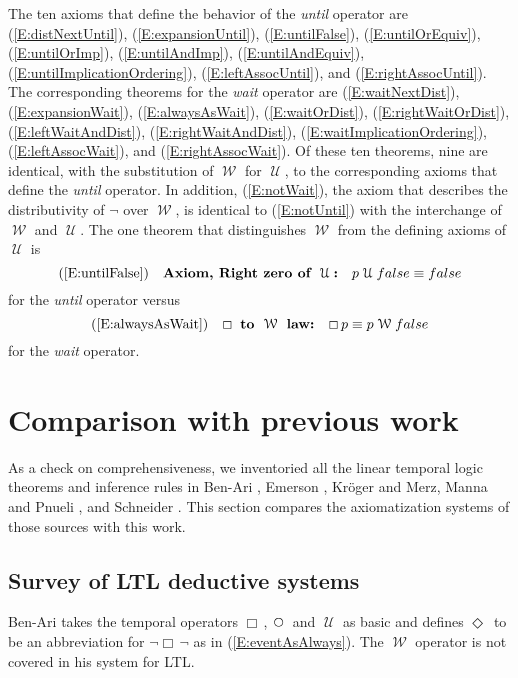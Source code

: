 \documentclass[12pt, fleqn, leqno]{article}
\newcommand{\Until}{\;\mathcal{U}\;}
\newcommand{\Wait}{\;\mathcal{W}\;}
\newcommand{\Next}{\;\,\text{\raisebox{3.5pt}{\circle{6}}}}
\newcommand{\Event}{\Diamond\,}
\newcommand{\Always}{\Box\,}
\begin{document}
The ten axioms that define the behavior of the \textit{until} operator are (\ref{E:distNextUntil}), (\ref{E:expansionUntil}), (\ref{E:untilFalse}), (\ref{E:untilOrEquiv}), (\ref{E:untilOrImp}), (\ref{E:untilAndImp}), (\ref{E:untilAndEquiv}), (\ref{E:untilImplicationOrdering}), (\ref{E:leftAssocUntil}), and (\ref{E:rightAssocUntil}).
The corresponding theorems for the \textit{wait} operator are (\ref{E:waitNextDist}), (\ref{E:expansionWait}), (\ref{E:alwaysAsWait}), (\ref{E:waitOrDist}), (\ref{E:rightWaitOrDist}), (\ref{E:leftWaitAndDist}), (\ref{E:rightWaitAndDist}), (\ref{E:waitImplicationOrdering}), (\ref{E:leftAssocWait}), and (\ref{E:rightAssocWait}).
Of these ten theorems, nine are identical, with the substitution of $\Wait$ for $\Until$, to the corresponding axioms that define the \textit{until} operator.
In addition, (\ref{E:notWait}), the axiom that describes the distributivity of $\neg$ over $\Wait$, is identical to (\ref{E:notUntil}) with the interchange of $\Wait$ and $\Until$.
The one theorem that distinguishes $\Wait$ from the defining axioms of $\Until$ is
\begin{equation}
(\ref{E:untilFalse})\quad \textbf{Axiom, Right zero of $\Until$:}\quad p \Until false \equiv false \nonumber
\end{equation}
for the \textit{until} operator versus
\begin{equation}
(\ref{E:alwaysAsWait})\quad \textbf{$\Always$ to $\Wait$ law:}\quad \Always p \equiv p \Wait false \nonumber
\end{equation}
for the \textit{wait} operator.

\section{Comparison with previous work}\label{comparison-previous-work}

As a check on comprehensiveness, we inventoried all the linear temporal logic theorems and inference rules in Ben-Ari \cite{Ben}, Emerson \cite{Emer}, Kröger and Merz\cite{Kroger}, Manna and Pnueli \cite{Manna}, and Schneider \cite{Schn}.
This section compares the axiomatization systems of those sources with this work.

\subsection{Survey of LTL deductive systems}\label{section-survey}

Ben-Ari \cite{Ben} takes the temporal operators $\Always$, $\Next$ and $\Until$ as basic and defines $\Event$ to be an abbreviation for $\neg \Always \neg$ as in (\ref{E:eventAsAlways}).
The $\Wait$ operator is not covered in his system for LTL.
\end{document}
